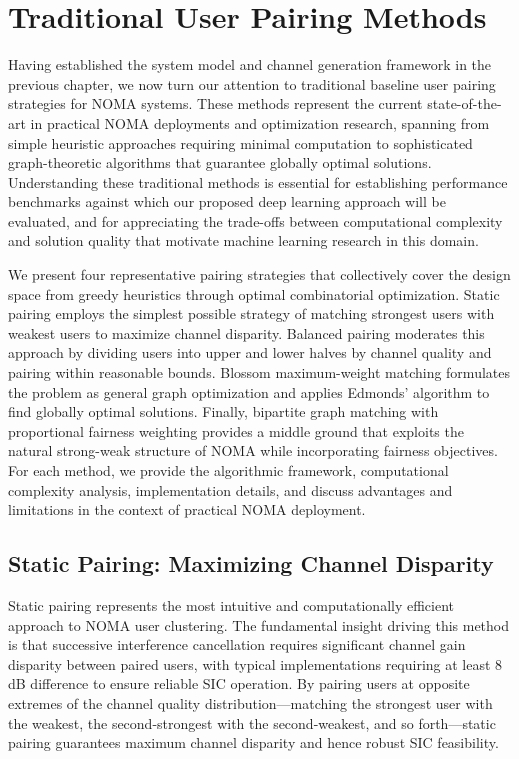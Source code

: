 \chapter{Traditional User Pairing Methods}
\label{chap:traditional}

Having established the system model and channel generation framework in the previous chapter, we now turn our attention to traditional baseline user pairing strategies for NOMA systems. These methods represent the current state-of-the-art in practical NOMA deployments and optimization research, spanning from simple heuristic approaches requiring minimal computation to sophisticated graph-theoretic algorithms that guarantee globally optimal solutions. Understanding these traditional methods is essential for establishing performance benchmarks against which our proposed deep learning approach will be evaluated, and for appreciating the trade-offs between computational complexity and solution quality that motivate machine learning research in this domain.

We present four representative pairing strategies that collectively cover the design space from greedy heuristics through optimal combinatorial optimization. Static pairing employs the simplest possible strategy of matching strongest users with weakest users to maximize channel disparity. Balanced pairing moderates this approach by dividing users into upper and lower halves by channel quality and pairing within reasonable bounds. Blossom maximum-weight matching formulates the problem as general graph optimization and applies Edmonds' algorithm to find globally optimal solutions. Finally, bipartite graph matching with proportional fairness weighting provides a middle ground that exploits the natural strong-weak structure of NOMA while incorporating fairness objectives. For each method, we provide the algorithmic framework, computational complexity analysis, implementation details, and discuss advantages and limitations in the context of practical NOMA deployment.

\section{Static Pairing: Maximizing Channel Disparity}

Static pairing represents the most intuitive and computationally efficient approach to NOMA user clustering. The fundamental insight driving this method is that successive interference cancellation requires significant channel gain disparity between paired users, with typical implementations requiring at least 8 dB difference to ensure reliable SIC operation. By pairing users at opposite extremes of the channel quality distribution—matching the strongest user with the weakest, the second-strongest with the second-weakest, and so forth—static pairing guarantees maximum channel disparity and hence robust SIC feasibility.

